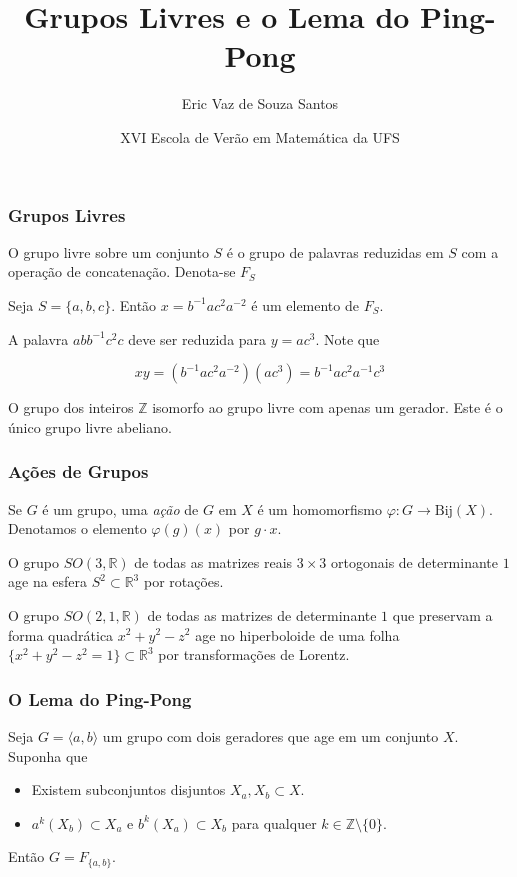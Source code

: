 \documentclass{beamer}
\title{Grupos Livres e o Lema do Ping-Pong}
\author{Eric Vaz de Souza Santos}
\institute{Universidade Federal de Sergipe}
\date[2025]
{XVI Escola de Verão em Matemática da UFS}
\begin{document}
\frame{\titlepage}

\begin{frame}
\frametitle{Grupos Livres}
O grupo livre sobre um conjunto $S$ é o grupo de palavras reduzidas em $S$ com a operação de concatenação. Denota-se $F_S$
\begin{example}
    Seja $S = \{a,b,c\}$. Então $x = b^{-1}ac^2a^{-2}$ é um elemento de $F_S$.

    A palavra $a b b^{-1} c^2 c$ deve ser reduzida para $y = ac^3$. Note que

    \[xy = (b^{-1}ac^2a^{-2})(ac^3) = b^{-1}ac^2a^{-1}c^3\]
\end{example}

\pause
\begin{example}
    O grupo dos inteiros $\mathbb{Z}$ isomorfo ao grupo livre com apenas um gerador. Este é o único grupo livre abeliano.
\end{example}
\end{frame}

\begin{frame}
    \frametitle{Ações de Grupos}

    \begin{definition}
    Se $G$ é um grupo, uma \textit{ação} de $G$ em $X$ é um homomorfismo $\varphi: G \to \text{Bij}(X)$.
    Denotamos o elemento $\varphi(g)(x)$ por $g \cdot x$.
    \end{definition}

    \pause
    \begin{example}
        O grupo $SO(3, \mathbb{R})$ de todas as matrizes reais $3\times 3$ ortogonais de determinante $1$ age na esfera $S^2\subset\mathbb{R}^3$ por rotações.
    \end{example}

    \pause
    \begin{example}
        O grupo $SO(2,1,\mathbb{R})$ de todas as matrizes de determinante $1$ que preservam a forma quadrática $x^2 + y^2 - z^2$ age no hiperboloide de uma folha $\{x^2+y^2-z^2 = 1\}\subset\mathbb{R}^3$ por transformações de Lorentz.
    \end{example}
\end{frame}

\begin{frame}
    \frametitle{O Lema do Ping-Pong}

    \begin{lemma}
        Seja $G = \langle a, b\rangle$ um grupo com dois geradores que age em um conjunto $X$. Suponha que
        \begin{itemize}
            \item Existem subconjuntos disjuntos $X_a, X_b\subset X$.
            \item $a^k(X_b)\subset X_a$ e $b^k(X_a)\subset X_b$ para qualquer $k\in\mathbb{Z}\setminus\{0\}$.
        \end{itemize}
        Então $G = F_{\{a,b\}}$.
    \end{lemma}
\end{frame}
\end{document}

